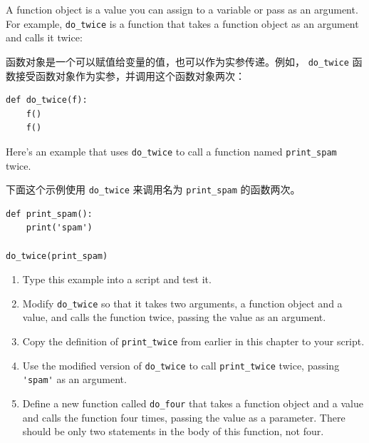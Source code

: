 \begin{exercise}
  

A function object is a value you can assign to a variable
or pass as an argument.  For example, \verb"do_twice" is a function
that takes a function object as an argument and calls it twice:

函数对象是一个可以赋值给变量的值，也可以作为实参传递。例如，
\lstinline{do_twice} 函数接受函数对象作为实参，并调用这个函数对象两次：

\begin{lstlisting}
def do_twice(f):
    f()
    f()
\end{lstlisting}

Here's an example that uses \verb"do_twice" to call a function
named \verb"print_spam" twice.


下面这个示例使用 \lstinline{do_twice} 来调用名为 \lstinline{print_spam} 的函数两次。

\begin{lstlisting}
def print_spam():
    print('spam')

do_twice(print_spam)
\end{lstlisting}

\begin{enumerate}

\item Type this example into a script and test it.

\item Modify \verb"do_twice" so that it takes two arguments, a
function object and a value, and calls the function twice,
passing the value as an argument.

\item Copy the definition of
\verb"print_twice" from earlier in this chapter to your script.

\item Use the modified version of \verb"do_twice" to call
\verb"print_twice" twice, passing \verb"'spam'" as an argument.

\item Define a new function called
\verb"do_four" that takes a function object and a value
and calls the function four times, passing the value
as a parameter.  There should be only
two statements in the body of this function, not four.

\end{enumerate}

\begin{enumerate}


\end{enumerate}
\end{exercise}
